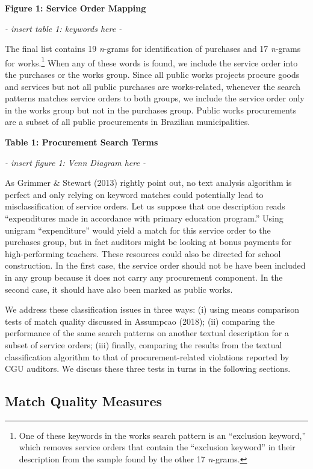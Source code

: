\documentclass[]{article}
\let\rmarkdownfootnote\footnote%
\def\footnote{\protect\rmarkdownfootnote}
\theoremstyle{definition}
\theoremstyle{definition}
\theoremstyle{definition}
\theoremstyle{remark}
\begin{document}
\textbf{Figure 1: Service Order Mapping}

\emph{- insert table 1: keywords here -}

The final list contains 19 \emph{n}-grams for identification of
purchases and 17 \emph{n}-grams for works.\footnote{One of these
  keywords in the works search pattern is an ``exclusion keyword,''
  which removes service orders that contain the ``exclusion keyword'' in
  their description from the sample found by the other 17
  \emph{n}-grams.} When any of these words is found, we include the
service order into the purchases or the works group. Since all public
works projects procure goods and services but not all public purchases
are works-related, whenever the search patterns matches service orders
to both groups, we include the service order only in the works group but
not in the purchases group. Public works procurements are a subset of
all public procurements in Brazilian municipalities.

\textbf{Table 1: Procurement Search Terms}

\emph{- insert figure 1: Venn Diagram here -}

As Grimmer \& Stewart (2013) rightly point out, no text analysis
algorithm is perfect and only relying on keyword matches could
potentially lead to misclassification of service orders. Let us suppose
that one description reads ``expenditures made in accordance with
primary education program.'' Using unigram ``expenditure'' would yield a
match for this service order to the purchases group, but in fact
auditors might be looking at bonus payments for high-performing
teachers. These resources could also be directed for school
construction. In the first case, the service order should not be have
been included in any group because it does not carry any procurement
component. In the second case, it should have also been marked as public
works.

We address these classification issues in three ways: (i) using means
comparison tests of match quality discussed in Assumpcao (2018); (ii)
comparing the performance of the same search patterns on another textual
description for a subset of service orders; (iii) finally, comparing the
results from the textual classification algorithm to that of
procurement-related violations reported by CGU auditors. We discuss
these three tests in turns in the following sections.

\hypertarget{quality1}{%
\subsection{Match Quality Measures}\label{quality1}}
\end{document}
